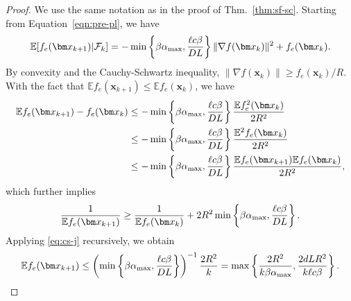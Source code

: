 \documentclass[10pt]{article} %
\numberwithin{equation}{section}
\theoremstyle{plain}
\theoremstyle{definition}
\newcommand{\<}{\langle}
\renewcommand{\>}{\rangle}
\renewcommand{\(}{\left(}
\renewcommand{\)}{\right)}
\renewcommand{\[}{\left[}
\renewcommand{\]}{\right]}
\newcommand{\alphaMax}{\alpha_\textup{max}}
\newcommand{\Lip}{L}
\begin{document}
\begin{proof}
We use the same notation as in the proof of Thm.~\ref{thm:sf-sc}. 
Starting from Equation~\eqref{eqn:pre-pl}, we have 
\begin{equation}
\mathbb{E}[f_e(\bm x_{k+1})\vert\mathcal{F}_k]
= -\min\left\{\beta \alphaMax,\frac{\ell c\beta}{D\Lip}\right\}\lVert \nabla f(\bm x_k)\rVert^2 + f_e(\bm x_k).
\end{equation}
By convexity and the Cauchy-Schwartz inequality, $\lVert \nabla f(\bm x_k)\rVert\geq f_e(\bm x_k)/R$. With the fact that $\mathbb{E}f_e(\bm x_{k+1})\leq \mathbb{E}f_e(\bm x_k)$, we have
\begin{equation}
\begin{aligned}
\mathbb{E}f_e(\bm x_{k+1}) - f_e(\bm x_k) 
&\leq - \min\left\{\beta \alphaMax,\frac{\ell c\beta}{D\Lip}\right\}\frac{\mathbb{E}f^2_e(\bm x_k)}{2R^2}\\
&\leq - \min\left\{\beta \alphaMax,\frac{\ell c\beta}{D\Lip}\right\}\frac{\mathbb{E}^2f_e(\bm x_k)}{2R^2}\\
&\leq - \min\left\{\beta \alphaMax,\frac{\ell c\beta}{D\Lip}\right\}\frac{\mathbb{E}f_e(\bm x_{k+1})\mathbb{E}f_e(\bm x_k)}{2R^2},
\end{aligned}
\end{equation}
which further implies
\begin{equation}
\label{eq:cs-j}
\frac{1}{\mathbb{E}f_e(\bm x_{k+1})} \geq \frac{1}{\mathbb{E}f_e(\bm x_{k})} + 2R^2\min\left\{\beta \alphaMax,\frac{\ell c\beta}{D\Lip}\right\}.
\end{equation}
Applying \eqref{eq:cs-j} recursively, we obtain
\begin{equation}
\mathbb{E}f_e(\bm x_{k+1})\leq \left(\min\left\{\beta \alphaMax,\frac{\ell c\beta}{D\Lip}\right\}\right)^{-1}\frac{2R^2}{k}=\max\left\{\frac{2R^2}{k\beta \alphaMax}, \frac{2d\Lip R^2}{k\ell c\beta}\right\}.
\end{equation}
\end{proof}
\end{document}
